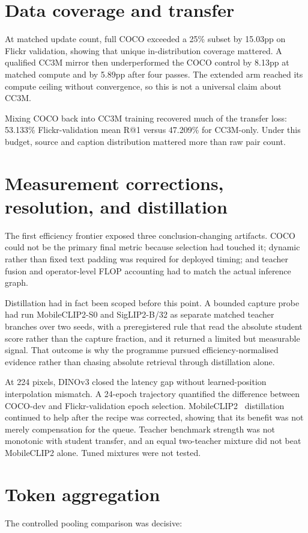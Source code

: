 \section{Data coverage and transfer}
At matched update count, full COCO exceeded a 25\% subset by 15.03pp on Flickr validation, showing that unique in-distribution coverage mattered. A qualified CC3M mirror then underperformed the COCO control by 8.13pp at matched compute and by 5.89pp after four passes. The extended arm reached its compute ceiling without convergence, so this is not a universal claim about CC3M.

Mixing COCO back into CC3M training recovered much of the transfer loss: 53.133\% Flickr-validation mean R@1 versus 47.209\% for CC3M-only. Under this budget, source and caption distribution mattered more than raw pair count.

\section{Measurement corrections, resolution, and distillation}
The first efficiency frontier exposed three conclusion-changing artifacts. COCO could not be the primary final metric because selection had touched it; dynamic rather than fixed text padding was required for deployed timing; and teacher fusion and operator-level FLOP accounting had to match the actual inference graph.

Distillation had in fact been scoped before this point. A bounded capture probe had run MobileCLIP2-S0 and SigLIP2-B/32 as separate matched teacher branches over two seeds, with a preregistered rule that read the absolute student score rather than the capture fraction, and it returned a limited but measurable signal. That outcome is why the programme pursued efficiency-normalised evidence rather than chasing absolute retrieval through distillation alone.

At 224 pixels, DINOv3 closed the latency gap without learned-position interpolation mismatch. A 24-epoch trajectory quantified the difference between COCO-dev and Flickr-validation epoch selection. MobileCLIP2~\cite{faghri2025mobileclip2} distillation continued to help after the recipe was corrected, showing that its benefit was not merely compensation for the queue. Teacher benchmark strength was not monotonic with student transfer, and an equal two-teacher mixture did not beat MobileCLIP2 alone. Tuned mixtures were not tested.

\section{Token aggregation}
The controlled pooling comparison was decisive:

